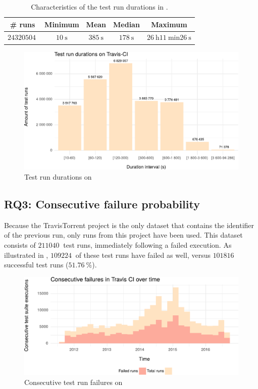 \begin{table}[h]
	\centering
	\begin{tabularx}{\textwidth}{|C|C|C|C|C|}
		\hline
		\textbf{\# runs} & \textbf{Minimum} & \textbf{Mean} & \textbf{Median} & \textbf{Maximum}\\
		\hline
		$\SI{24320504}{}$ & $\SI{10}{\second}$ & $\SI{385}{\second}$ & $\SI{178}{\second}$ & $\SI{26}{\hour} \SI{11}{\minute} \SI{26}{\second}$\\
		\hline
	\end{tabularx}
	\caption{Characteristics of the test run durations in \cite{travisanalysis}.}
	\label{tbl:rq2-characteristics}
\end{table}

\begin{figure}[htbp!]
	\centering
	\includegraphics[width=\textwidth]{assets/charts/rq2-test-run-durations.pdf}
	\caption{Test run durations on \travisci{}}
	\label{fig:rq2-durations}
\end{figure}


\subsection{RQ3: Consecutive failure probability}
Because the TravisTorrent project is the only dataset that contains the identifier of the previous run, only runs from this project have been used. This dataset consists of $\SI{211040}{}$ test runs, immediately following a failed execution. As illustrated in , $\SI{109224}{}$ of these test runs have failed as well, versus $\SI{101816}{}$ successful test runs ($\SI{51.76}{\percent}$).

\begin{figure}[htbp!]
	\centering
	\includegraphics[width=\textwidth]{assets/charts/rq3-consecutive-failure.pdf}
	\caption{Consecutive test run failures on \travisci{}}
	\label{fig:rq3-consecutive-failure}
\end{figure}

